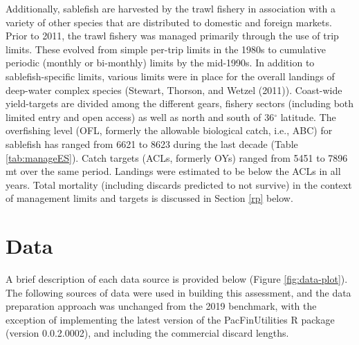 \documentclass[11pt,
  english,
  a4paper,
]{article}
\begin{document}
\leavevmode\tagmcend\tagstructend\par


Additionally, sablefish are harvested by the trawl fishery in association with a variety of other species that are distributed to domestic and foreign markets. Prior to 2011, the trawl fishery was managed primarily through the use of trip limits. These evolved from simple per-trip limits in the 1980s to cumulative periodic (monthly or bi-monthly) limits by the mid-1990s. In addition to sablefish-specific limits, various limits were in place for the overall landings of deep-water complex species ({Stewart, Thorson, and Wetzel (2011)\leavevmode\tagmcend\tagstructend}). Coast-wide yield-targets are divided among the different gears, fishery sectors (including both limited entry and open access) as well as north and south of 36{\(^{\circ}\)\leavevmode\tagmcend\tagstructend} latitude. The overfishing level (OFL, formerly the allowable biological catch, i.e., ABC) for sablefish has ranged from 6621 to 8623 during the last decade (Table \ref{tab:manageES}). Catch targets (ACLs, formerly OYs) ranged from 5451 to 7896 mt over the same period. Landings were estimated to be below the ACLs in all years. Total mortality (including discards predicted to not survive) in the context of management limits and targets is discussed in Section \ref{rp} below.

\leavevmode\tagmcend\tagstructend\par


\hypertarget{data}{%
\section{Data}\label{data}}

\leavevmode\tagmcend\tagstructend

A brief description of each data source is provided below (Figure \ref{fig:data-plot}). The following sources of data were used in building this assessment, and the data preparation approach was unchanged from the 2019 benchmark, with the exception of implementing the latest version of the PacFinUtilities R package (version 0.0.2.0002), and including the commercial discard lengths.
\end{document}
